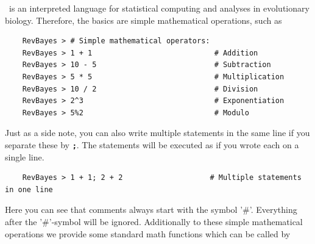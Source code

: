 \documentclass[11pt]{article}
\newcommand{\cl}[1]{{\texttt{\textbf{#1}}}}
\begin{document}
\Rev~is an interpreted language for statistical computing and analyses in evolutionary biology. Therefore, the basics are simple mathematical operations, such as 
{\tt \begin{snugshade*}
\begin{lstlisting}    
    RevBayes > # Simple mathematical operators:
    RevBayes > 1 + 1                            # Addition
    RevBayes > 10 - 5                           # Subtraction
    RevBayes > 5 * 5                            # Multiplication
    RevBayes > 10 / 2                           # Division
    RevBayes > 2^3                              # Exponentiation
    RevBayes > 5%2                              # Modulo
\end{lstlisting}
\end{snugshade*}}
Just as a side note, you can also write multiple statements in the same line if you separate these by \cl{;}.
The statements will be executed as if you wrote each on a single line.
{\tt \begin{snugshade*}
\begin{lstlisting}    
    RevBayes > 1 + 1; 2 + 2                    # Multiple statements in one line
\end{lstlisting}
\end{snugshade*}}
    
Here you can see that comments always start with the symbol '\#'. 
Everything after the '\#'-symbol will be ignored.
Additionally to these simple mathematical operations we provide some standard math functions which can be called by
    
\end{document}
